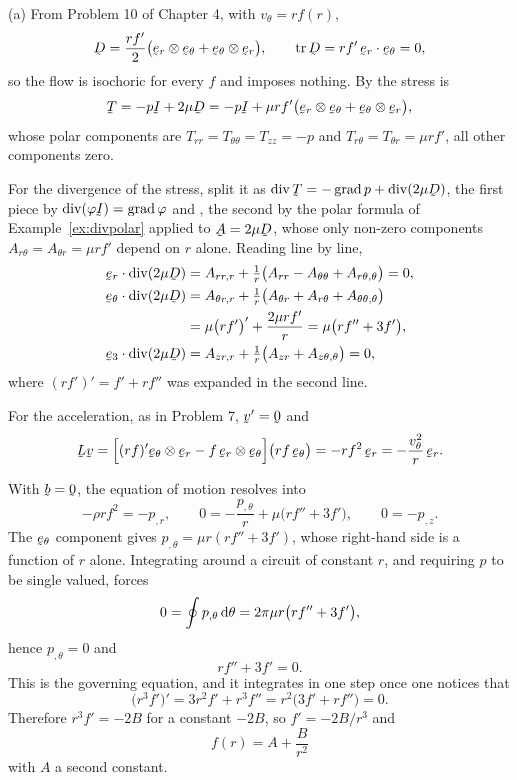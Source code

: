 \begin{solution}
(a) From Problem 10 of Chapter 4, with $v_{\theta}=rf(r)$,
\[
   \bD=\frac{rf'}{2}\big(\ber\otimes\bet+\bet\otimes\ber\big),
   \qquad \tr\bD=rf'\,\ip{\ber}{\bet}=0,
\]
so the flow is isochoric for every $f$ and  imposes nothing.
By  the stress is
\[
   \bT=-p\I+2\mu\bD
   =-p\I+\mu rf'\big(\ber\otimes\bet+\bet\otimes\ber\big),
\]
whose polar components are $T_{rr}=T_{\theta\theta}=T_{zz}=-p$ and
$T_{r\theta}=T_{\theta r}=\mu rf'$, all other components zero.

For the divergence of the stress, split it as
$\dvg\bT=-\grad p+\dvg(2\mu\bD)$, the first piece by
$\dvg(\varphi\I)=\grad\varphi$ and , the second by the polar
formula  of Example~\ref{ex:divpolar} applied to
$\bA=2\mu\bD$, whose only non-zero components $A_{r\theta}=A_{\theta r}
=\mu rf'$ depend on $r$ alone. Reading  line by line,
\[
\begin{aligned}
   \ber\cdot\dvg(2\mu\bD)&=A_{rr,r}
     +\tfrac1r\big(A_{rr}-A_{\theta\theta}+A_{r\theta,\theta}\big)=0,\\
   \bet\cdot\dvg(2\mu\bD)&=A_{\theta r,r}
     +\tfrac1r\big(A_{\theta r}+A_{r\theta}+A_{\theta\theta,\theta}\big)\\
   &=\mu\big(rf'\big)'+\frac{2\mu rf'}{r}
     =\mu\big(rf''+3f'\big),\\
   \be_{3}\cdot\dvg(2\mu\bD)&=A_{zr,r}
     +\tfrac1r\big(A_{zr}+A_{z\theta,\theta}\big)=0,
\end{aligned}
\]
where $(rf')'=f'+rf''$ was expanded in the second line.

For the acceleration, as in Problem 7, $\bv'=\bze$ and
\[
   \bL\bv=\Big[(rf)'\bet\otimes\ber-f\,\ber\otimes\bet\Big]
     \big(rf\,\bet\big)
   =-rf^{2}\,\ber=-\frac{v_{\theta}^{2}}{r}\,\ber .
\]

With $\bb=\bze$, the equation of motion  resolves
into
\[
   -\rho rf^{2}=-p_{,r},
   \qquad
   0=-\frac{p_{,\theta}}{r}+\mu\big(rf''+3f'\big),
   \qquad
   0=-p_{,z}.
\]
The $\bet$ component gives $p_{,\theta}=\mu r(rf''+3f')$, whose
right-hand side is a function of $r$ alone. Integrating around a circuit
of constant $r$, and requiring $p$ to be single valued, forces
\[
   0=\oint p_{,\theta}\,\mathrm{d}\theta=2\pi\mu r\big(rf''+3f'\big),
\]
hence $p_{,\theta}=0$ and
\[
   rf''+3f'=0 .
\]
This is the governing equation, and it integrates in one step once one
notices that
\[
   \big(r^{3}f'\big)'=3r^{2}f'+r^{3}f''=r^{2}\big(3f'+rf''\big)=0 .
\]
Therefore $r^{3}f'=-2B$ for a constant $-2B$, so $f'=-2B/r^{3}$ and
\[
   f(r)=A+\frac{B}{r^{2}}
\]
with $A$ a second constant.


\end{solution}
